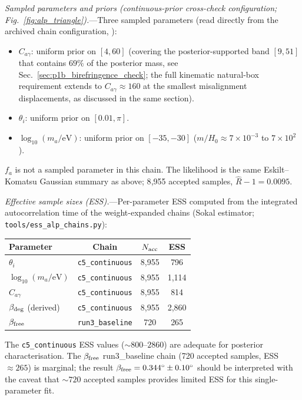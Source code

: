 \documentclass[aps,prd,twocolumn,superscriptaddress,showpacs,preprintnumbers,nofootinbib,longbibliography,floatfix]{revtex4-2}
\begin{document}
\textit{Sampled parameters and priors (continuous-prior cross-check
configuration; Fig.~\ref{fig:alp_triangle}).}---Three sampled parameters
(read directly from the archived chain configuration,
):
\begin{itemize}[leftmargin=*]
\item $C_{a\gamma}$: uniform prior on $[4, 60]$ (covering the
posterior-supported band $[9, 51]$ that contains $69\%$ of the
posterior mass, see Sec.~\ref{sec:p1b_birefringence_check}; the full
kinematic natural-box requirement extends to $C_{a\gamma}\approx 160$
at the smallest misalignment displacements, as discussed in the same
section).
\item $\theta_i$: uniform prior on $[0.01, \pi]$.
\item $\log_{10}(m_a/\text{eV})$: uniform prior on $[-35, -30]$
($m/H_0 \approx 7\times 10^{-3}$ to $7\times 10^{2}$).
\end{itemize}
$f_a$ is not a sampled parameter in this chain. The likelihood is the same
Eskilt--Komatsu Gaussian summary as above; 8{,}955 accepted samples,
$\hat R - 1 = 0.0095$.

\textit{Effective sample sizes (ESS).}---Per-parameter ESS computed from
the integrated autocorrelation time of the weight-expanded chains
(Sokal estimator; \texttt{tools/ess\_alp\_chains.py}):
\begin{center}
\begin{tabular}{lccc}
\hline
Parameter & Chain & $N_{\rm acc}$ & ESS \\
\hline
$\theta_i$ & \texttt{c5\_continuous} & 8{,}955 & 796 \\
$\log_{10}(m_a/\text{eV})$ & \texttt{c5\_continuous} & 8{,}955 & 1{,}114 \\
$C_{a\gamma}$ & \texttt{c5\_continuous} & 8{,}955 & 814 \\
$\beta_{\rm deg}$ (derived) & \texttt{c5\_continuous} & 8{,}955 & 2{,}860 \\
$\beta_{\rm free}$ & \texttt{run3\_baseline} & 720 & 265 \\
\hline
\end{tabular}
\end{center}
The \texttt{c5\_continuous} ESS values (${\sim}800$--$2860$) are adequate for
posterior characterisation. The $\beta_{\rm free}$ run3\_baseline chain
(720 accepted samples, ESS$\approx 265$) is marginal; the result
$\beta_{\rm free}=0.344^\circ\pm 0.10^\circ$ should be interpreted with
the caveat that ${\sim}720$ accepted samples provides limited ESS for
this single-parameter fit.
\end{document}
